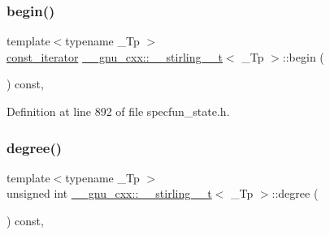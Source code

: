 \mbox{\label{struct____gnu__cxx_1_1____stirling__2__t_a08a6d69b6eb583c6cb60ea3d05e24b97}} 
\subsubsection{\texorpdfstring{begin()}{begin()}\hspace{0.1cm}{\footnotesize\ttfamily [2/2]}}
{\footnotesize\ttfamily template$<$typename \+\_\+\+Tp $>$ \\
\hyperlink{struct____gnu__cxx_1_1____stirling__2__t_a1de3af89467d37bd2d1f1228186c08e8}{const\+\_\+iterator} \hyperlink{struct____gnu__cxx_1_1____stirling__2__t}{\+\_\+\+\_\+gnu\+\_\+cxx\+::\+\_\+\+\_\+stirling\+\_\+\_\+t}$<$ \+\_\+\+Tp $>$\+::begin (\begin{DoxyParamCaption}{ }\end{DoxyParamCaption}) const\hspace{0.3cm}{\ttfamily [inline]}, {\ttfamily [noexcept]}}



Definition at line 892 of file specfun\+\_\+state.\+h.

\mbox{\label{struct____gnu__cxx_1_1____stirling__2__t_aba71844786b83ff8b5b8eba1518d2d47}} 
\subsubsection{\texorpdfstring{degree()}{degree()}}
{\footnotesize\ttfamily template$<$typename \+\_\+\+Tp $>$ \\
unsigned int \hyperlink{struct____gnu__cxx_1_1____stirling__2__t}{\+\_\+\+\_\+gnu\+\_\+cxx\+::\+\_\+\+\_\+stirling\+\_\+\_\+t}$<$ \+\_\+\+Tp $>$\+::degree (\begin{DoxyParamCaption}{ }\end{DoxyParamCaption}) const\hspace{0.3cm}{\ttfamily [inline]}, {\ttfamily [noexcept]}}



